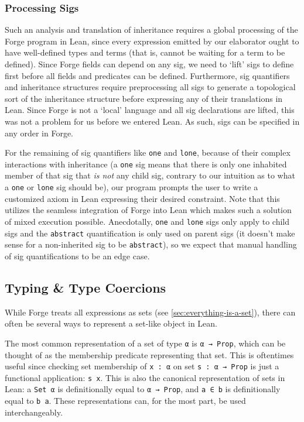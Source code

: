 \subsubsection{Processing Sigs}

Such an analysis and translation of inheritance requires a global processing of the Forge program in Lean, since every expression emitted by our elaborator ought to have well-defined types and terms (that is, cannot be waiting for a term to be defined). Since Forge fields can depend on any sig, we need to `lift' sigs to define first before all fields and predicates can be defined. Furthermore, sig quantifiers and inheritance structures require preprocessing all sigs to generate a topological sort of the inheritance structure before expressing any of their translations in Lean. Since Forge is not a `local' language and all sig declarations are lifted, this was not a problem for us before we entered Lean. As such, sigs can be specified in any order in Forge. 

For the remaining of sig quantifiers like \texttt{one} and \texttt{lone}, because of their complex interactions with inheritance (a \texttt{one} sig means that there is only one inhabited member of that sig that \emph{is not} any child sig, contrary to our intuition as to what a \texttt{one} or \texttt{lone} sig should be), our program prompts the user to write a customized axiom in Lean expressing their desired constraint. Note that this utilizes the seamless integration of Forge into Lean which makes such a solution of mixed execution possible. Anecdotally, \texttt{one} and \texttt{lone} sigs only apply to child sigs and the \texttt{abstract} quantification is only used on parent sigs (it doesn't make sense for a non-inherited sig to be \texttt{abstract}), so we expect that manual handling of sig quantifications to be an edge case. 


\subsection{Typing \& Type Coercions}\label{sec:type-coercions}
While Forge treats all expressions as sets (see \cref{sec:everything-is-a-set}), there can often be several ways to represent a set-like object in Lean. 

The most common representation of a set of type \texttt{α} is \texttt{α → Prop}, which can be thought of as the membership predicate representing that set. This is oftentimes useful since checking set membership of \texttt{x : α} on set \texttt{s : α → Prop} is just a functional application: \texttt{s x}. This is also the canonical representation of sets in Lean: a \texttt{Set α} is definitionally equal to \texttt{α → Prop}, and \texttt{a ∈ b} is definitionally equal to \texttt{b a}. These representations can, for the most part, be used interchangeably. 

